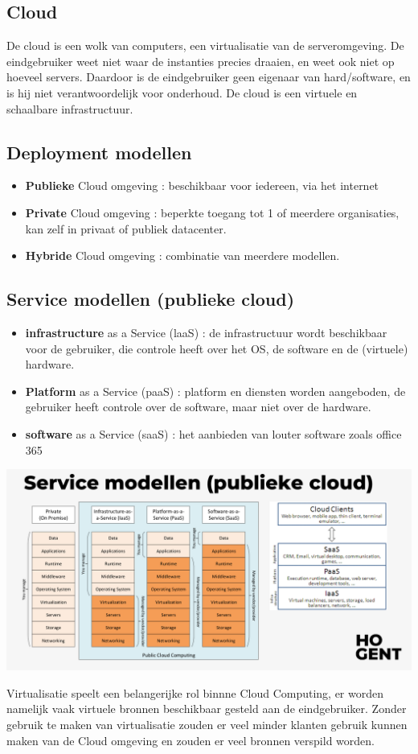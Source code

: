 \documentclass{report}
\begin{document}
   			\subsection{Cloud}
   				De cloud is een wolk van computers, een virtualisatie van de serveromgeving. De eindgebruiker weet niet waar de instanties precies draaien, en weet ook niet op hoeveel servers. Daardoor is de eindgebruiker geen eigenaar van hard/software, en is hij niet verantwoordelijk voor onderhoud. De cloud is een virtuele en schaalbare infrastructuur. 
   			\subsection{Deployment modellen}
   				\begin{itemize}
   					\item \textbf{Publieke} Cloud omgeving : beschikbaar voor iedereen, via het internet
   					\item \textbf{Private} Cloud omgeving : beperkte toegang tot 1 of meerdere organisaties, kan zelf in privaat of publiek datacenter.
   					\item \textbf{Hybride} Cloud omgeving : combinatie van meerdere modellen.
   				\end{itemize}
   			\subsection{Service modellen (publieke cloud)}
   				\begin{itemize}
   					\item \textbf{infrastructure} as a Service (laaS) : de infrastructuur wordt beschikbaar voor de gebruiker, die controle heeft over het OS, de software en de (virtuele) hardware. 
   					\item \textbf{Platform} as a Service (paaS) : platform en diensten worden aangeboden, de gebruiker heeft controle over de software, maar niet over de hardware.
   					\item \textbf{software} as a Service (saaS) : het aanbieden van louter software zoals office 365 
   				\end{itemize}
   				\begin{center}
   					\includegraphics[scale=0.4]{service_modellen}
   				\end{center}
   			Virtualisatie speelt een belangerijke rol binnne Cloud Computing, er worden namelijk vaak virtuele bronnen beschikbaar gesteld aan de eindgebruiker. Zonder gebruik te maken van virtualisatie zouden er veel minder klanten gebruik kunnen maken van de Cloud omgeving en zouden er veel bronnen verspild worden. 
\end{document}
